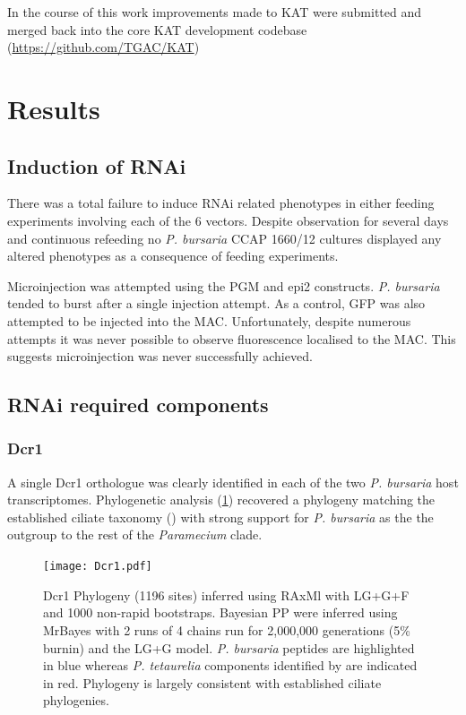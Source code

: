 In the course of this work improvements made to KAT were submitted and merged
back into the core KAT development codebase (\url{https://github.com/TGAC/KAT})

\section{Results}

\subsection{Induction of RNAi}

There was a total failure to induce RNAi related phenotypes
in either feeding experiments involving each of the 6 vectors. 
Despite observation for several days and continuous refeeding
no \textit{P. bursaria} CCAP 1660/12 cultures displayed any
altered phenotypes as a consequence of feeding experiments. 

Microinjection was attempted using the PGM and epi2 constructs.
\textit{P. bursaria} tended to burst after a single injection attempt.
As a control, GFP was also attempted to be injected into the MAC.
Unfortunately, despite numerous attempts it was never possible
to observe fluorescence localised to the MAC. This suggests
microinjection was never successfully achieved. 

\subsection{RNAi required components}

\subsubsection{Dcr1}

A single Dcr1 orthologue was clearly identified in each of
the two \textit{P. bursaria} host transcriptomes.
Phylogenetic analysis (\cref{fig:dcr1}) recovered a phylogeny
matching the established ciliate taxonomy (\citep{Aury2006,Fokin2004,Swart2013}) with strong support
for \textit{P. bursaria} as the the outgroup to the rest of 
the \textit{Paramecium} clade. 

\begin{figure}
    \texttt{[image: Dcr1.pdf]}
    \caption[Dcr1 Phylogeny]{Dcr1 Phylogeny (1196 sites) inferred using RAxMl with
        LG+G+F and 1000 non-rapid bootstraps.  Bayesian PP 
        were inferred using MrBayes with 2 runs of 4 chains run for 2,000,000
        generations (5\% burnin) and the LG+G model.  \textit{P. bursaria} peptides
        are highlighted in blue whereas \textit{P. tetaurelia} components
    identified by \citep{Marker2014} are indicated in red.  Phylogeny
is largely consistent with established ciliate phylogenies.}
    \label{fig:dcr1}
\end{figure}


